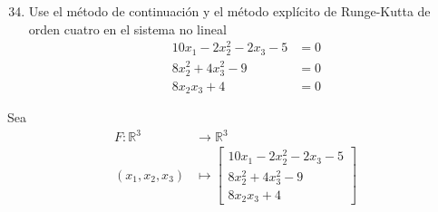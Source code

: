 \begin{frame}
	\begin{enumerate}\setcounter{enumi}{33}
		\item

		      Use el método de continuación y el método explícito de
		      Runge-Kutta de orden cuatro en el sistema no lineal
		      \begin{align*}
			      10x_{1}-2x^{2}_{2}-2x_{3}-5 & =0 \\
			      8x^2_{2}+4x^2_{3}-9         & =0 \\
			      8x_{2}x_{3}+4               & =0
		      \end{align*}
	\end{enumerate}

	\begin{solution}
		Sea
		\begin{align*}
			F\colon\mathbb{R}^{3} & \longrightarrow\mathbb{R}^{3} \\
			\left(
			x_{1},
			x_{2},
			x_{3}
			\right)
			                      & \longmapsto
			\begin{bmatrix}
				10x_{1}-2x^{2}_{2}-2x_{3}-5 \\
				8x^2_{2}+4x^2_{3}-9         \\
				8x_{2}x_{3}+4
			\end{bmatrix}
		\end{align*}
	\end{solution}
\end{frame}
